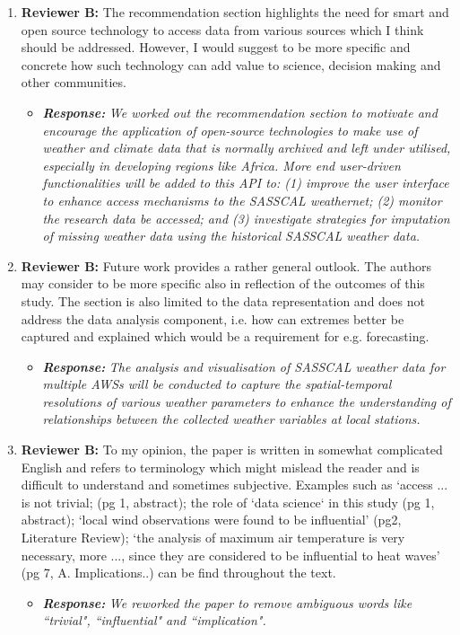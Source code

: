\documentclass[a4paper, 12pt, conference]{ieeeconf}      %
\begin{document}
\begin{enumerate}
\begin{itemize}
\end{itemize}

\item \textbf{Reviewer B:}  The recommendation section highlights the need for smart and open source technology to access data from various sources which I think should be addressed. However, I would suggest to be more specific and concrete how such technology can add value to science, decision making and other communities.

		\begin{itemize}
		\item \emph{\textbf{Response:}} \emph{We worked out the recommendation section to motivate and encourage the application of open-source technologies to make
			use of weather and climate data that is normally archived
			and left under utilised, especially in developing regions like
			Africa. More end user-driven functionalities will be added
			to this API to: (1) improve the user interface to enhance
			access mechanisms to the SASSCAL weathernet; (2) monitor
			the research data be accessed; and (3) investigate strategies
			for imputation of missing weather data using the historical
			SASSCAL weather data. }
	\end{itemize}
 
 \item 	\textbf{Reviewer B:}  Future work provides a rather general outlook. The authors may consider to be more specific also in reflection of the outcomes of this study. The section is also limited to the data representation and does not address the data analysis component, i.e. how can extremes better be captured and explained which would be a requirement for e.g. forecasting.
 
\begin{itemize}
	 \item  \emph{\textbf{Response:}} 
	\emph{The analysis and visualisation of
		SASSCAL weather data for multiple AWSs will be conducted
		to capture the spatial-temporal resolutions of various weather
		parameters to enhance the understanding of relationships
		between the collected weather variables at local stations.}
\end{itemize}
	

	\item  \textbf{Reviewer B:} To my opinion, the paper is written in somewhat complicated English and refers to terminology which might mislead the reader and is difficult to understand and sometimes subjective. Examples such as `access ... is not trivial; (pg 1, abstract); the role of `data science` in this study (pg 1, abstract); `local wind observations were found to be influential' (pg2, Literature Review); `the analysis of maximum air temperature is very necessary, more ..., since they are considered to be influential to heat waves' (pg 7, A. Implications..) can be find throughout the text.
	\begin{itemize}
		 \item  \emph{\textbf{Response:}} 
		\emph{We reworked the  paper  to remove ambiguous words like ``trivial", ``influential" and ``implication". }
	\end{itemize}
	


\end{enumerate}
\end{document}
